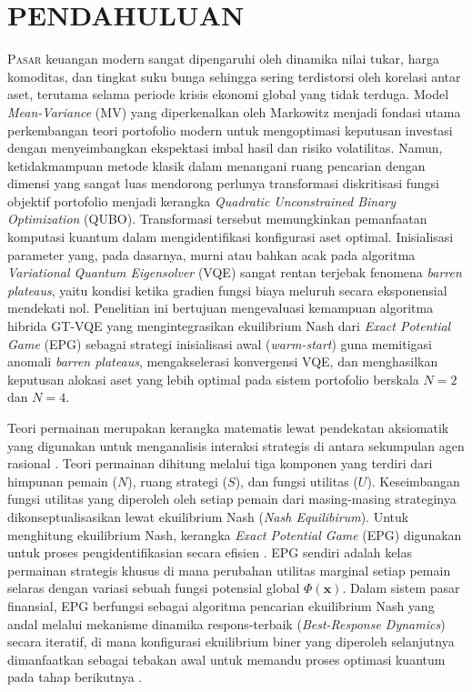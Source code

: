 \section{PENDAHULUAN}

\lettrine{P}{asar} keuangan modern sangat dipengaruhi oleh dinamika nilai tukar, harga komoditas, dan tingkat suku bunga sehingga sering terdistorsi oleh korelasi antar aset, terutama selama periode krisis ekonomi global yang tidak terduga. Model \textit{Mean-Variance} (MV) yang diperkenalkan oleh Markowitz menjadi fondasi utama perkembangan teori portofolio modern untuk mengoptimasi keputusan investasi dengan menyeimbangkan ekspektasi imbal hasil dan risiko volatilitas. Namun, ketidakmampuan metode klasik dalam menangani ruang pencarian dengan dimensi yang sangat luas mendorong perlunya transformasi diskritisasi fungsi objektif portofolio menjadi kerangka \textit{Quadratic Unconstrained Binary Optimization} (QUBO). Transformasi tersebut memungkinkan pemanfaatan komputasi kuantum dalam mengidentifikasi konfigurasi aset optimal. Inisialisasi parameter yang, pada dasarnya, murni atau bahkan acak pada algoritma \textit{Variational Quantum Eigensolver} (VQE) sangat rentan terjebak fenomena \textit{barren plateaus}, yaitu kondisi ketika gradien fungsi biaya meluruh secara eksponensial mendekati nol. Penelitian ini bertujuan mengevaluasi kemampuan algoritma hibrida GT-VQE yang mengintegrasikan ekuilibrium Nash dari \textit{Exact Potential Game} (EPG) sebagai strategi inisialisasi awal (\textit{warm-start}) guna memitigasi anomali \textit{barren plateaus}, mengakselerasi konvergensi VQE, dan menghasilkan keputusan alokasi aset yang lebih optimal pada sistem portofolio berskala $N=2$ dan $N=4$.

Teori permainan merupakan kerangka matematis lewat pendekatan aksiomatik yang digunakan untuk menganalisis interaksi strategis di antara sekumpulan agen rasional \cite{john_von_neumann_theory_1953}. Teori permainan dihitung melalui tiga komponen yang terdiri dari himpunan pemain ($N$), ruang strategi ($S$), dan fungsi utilitas ($U$). Keseimbangan fungsi utilitas yang diperoleh oleh setiap pemain dari masing-masing strateginya dikonseptualisasikan lewat ekuilibrium Nash (\textit{Nash Equilibirum}). Untuk menghitung ekuilibrium Nash, kerangka \textit{Exact Potential Game} (EPG) digunakan untuk proses pengidentifikasian secara efisien \cite{monderer_potential_1996}. EPG sendiri adalah kelas permainan strategis khusus di mana perubahan utilitas marginal setiap pemain selaras dengan variasi sebuah fungsi potensial global $\Phi(\mathbf{x})$. Dalam sistem pasar finansial, EPG berfungsi sebagai algoritma pencarian ekuilibrium Nash yang andal melalui mekanisme dinamika respons-terbaik (\textit{Best-Response Dynamics}) secara iteratif, di mana konfigurasi ekuilibrium biner yang diperoleh selanjutnya dimanfaatkan sebagai tebakan awal untuk memandu proses optimasi kuantum pada tahap berikutnya \cite{jain_multi-portfolio_2012,freitas_game_2024}.


